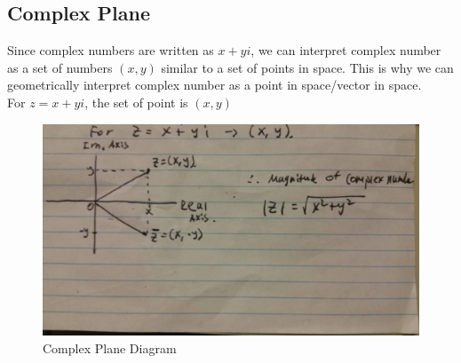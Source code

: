 \documentclass[12pt]{article}
\begin{document}
\subsection{Complex Plane}
Since complex numbers are written as $x+yi$, we can interpret complex number as a set of numbers $(x,y)$ similar to a set of points in space. This is why we can geometrically interpret complex number as a point in space/vector in space.\\
For $z = x+yi$, the set of point is $(x,y)$\\
\begin{figure}[!htb]
      	\centering
      	\includegraphics[scale=0.1]{ComplexPlane.jpg}
      	\caption{Complex Plane Diagram \label{fig:ComplexPlane}}
\end{figure}
\end{document}
